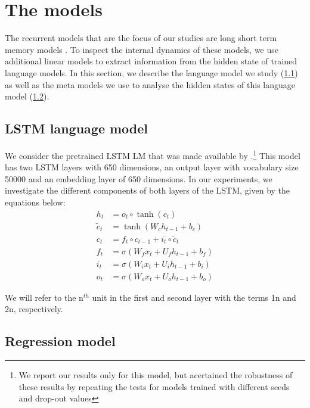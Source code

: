 
\section{The models}

The recurrent models that are the focus of our studies are long short term memory models \cite[LSTMs]{Hochreiter:Schmidhuber:1997}.
To inspect the internal dynamics of these models, we use additional linear models to extract information from the hidden state of trained language models.
In this section, we describe the language model we study (\ref{ssec:lstm_lm}) as well as the meta models we use to analyse the hidden states of this language model (\ref{ssec:dc}).

\subsection{LSTM language model}\label{ssec:lstm_lm}

We consider the pretrained LSTM LM that was made available by \cite{Gulordava:etal:2018}.\footnote{We report our results only for this model, but acertained the robustness of these results by repeating the tests for models trained with different seeds and drop-out values}
This model has two LSTM layers with 650 dimensions, an output layer with vocabulary size 50000 and an embedding layer of 650 dimensions.
In our experiments, we investigate the different components of both layers of the LSTM, given by the equations below:
\begin{align}
    h_t & = o_t\circ \tanh(c_t)\\ 
     \widetilde{c}_t & = \tanh(W_ch_{t-1} + b_c)\\
     c_t & = f_t\circ c_{t-1} + i_t\circ \widetilde{c}_t\\
     f_t & = \sigma(W_fx_t + U_fh_{t-1} + b_f) \\
     i_t & = \sigma(W_ix_t + U_ih_{t-1} + b_i) \\
     o_t & = \sigma(W_ox_t + U_oh_{t-1} + b_o)
\end{align}

We will refer to the n$^{th}$ unit in the first and second layer with the terms \unit{1}{n} and \unit{2}{n}, respectively.


\subsection{Regression model}\label{ssec:dc}

